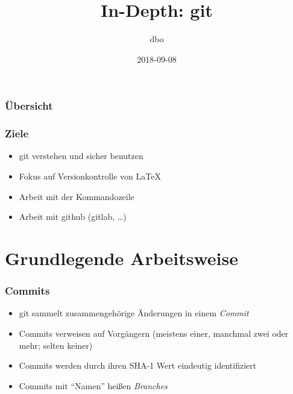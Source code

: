 \documentclass{cms-kurs}
\title{In-Depth: git}
\author{dbo}
\date{2018-09-08}
\begin{document}
\begin{frame}
  \frametitle{Übersicht}
  \tableofcontents{}
\end{frame}

\begin{frame}
  \frametitle{Ziele}

  \onslide<+->

  \begin{itemize}
  \item git verstehen und sicher benutzen
  \item Fokus auf Versionkontrolle von \LaTeX{}
  \item Arbeit mit der Kommandozeile
  \item Arbeit mit github (gitlab, …)
  \end{itemize}

\end{frame}

\section{Grundlegende Arbeitsweise}

\begin{frame}[fragile]
  \frametitle{Commits}

  \onslide<+->

  \begin{itemize}
  \item git sammelt zusammengehörige Änderungen in einem \emph{Commit}
  \item Commits verweisen auf Vorgängern (meistens einer, manchmal zwei oder
    mehr; selten keiner)
  \item Commits werden durch ihren SHA-1 Wert eindeutig identifiziert
  \item Commits mit \enquote{Namen} heißen \emph{Branches}
  \end{itemize}

  \begin{center}
  \end{center}

\end{frame}
\end{document}
